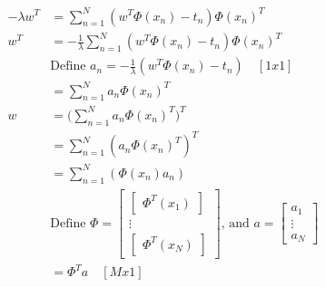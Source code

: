 \documentclass[../main.tex]{subfiles}
\begin{document}
\begin{align*}
    -\lambda w^T & = \sum_{n=1}^N (w^T\Phi(x_n) - t_n) \Phi(x_n)^T                                                                                                                                      \\
    w^T          & = -\frac{1}{\lambda} \sum_{n=1}^N (w^T\Phi(x_n) - t_n) \Phi(x_n)^T                                                                                                                   \\
                 & \text{Define } a_n = -\frac{1}{\lambda} (w^T\Phi(x_n) - t_n) \quad [1x1]                                                                                                             \\
                 & = \sum_{n=1}^N a_n \Phi(x_n)^T                                                                                                                                                       \\
    w            & = \bigg( \sum_{n=1}^N a_n \Phi(x_n)^T \bigg)^T                                                                                                                                       \\
                 & = \sum_{n=1}^N (a_n \Phi(x_n)^T)^T                                                                                                                                                   \\
                 & = \sum_{n=1}^N (\Phi(x_n) a_n)                                                                                                                                                       \\
                 & \text{Define } \Phi = \begin{bmatrix}\begin{bmatrix}\Phi^T(x_1)\end{bmatrix}\\ \vdots \\ \begin{bmatrix} \Phi^T(x_N)\end{bmatrix}\end{bmatrix} \text{, and } a=\begin{bmatrix}a_1 \\ \vdots \\ a_N\end{bmatrix} \\
                 & = \Phi^T a \quad [Mx1]
\end{align*}
\end{document}
